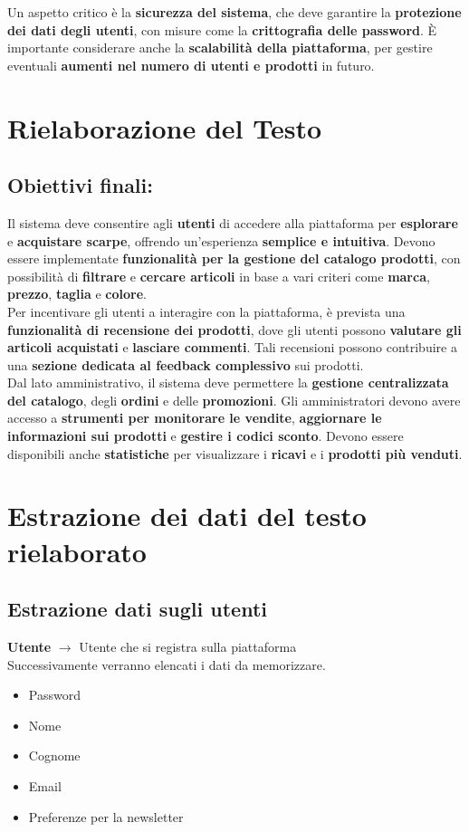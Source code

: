 \documentclass[a4paper,12pt]{report}
\begin{document}
	Un aspetto critico è la \textbf{sicurezza del sistema}, che deve garantire la \textbf{protezione dei dati degli utenti}, con misure come la \textbf{crittografia delle password}. È importante considerare anche la \textbf{scalabilità della piattaforma}, per gestire eventuali \textbf{aumenti nel numero di utenti e prodotti} in futuro.
	
	\section{Rielaborazione del Testo}
	\subsection{Obiettivi finali:}
	Il sistema deve consentire agli \textbf{utenti} di accedere alla piattaforma per \textbf{esplorare} e \textbf{acquistare scarpe}, offrendo un'esperienza \textbf{semplice e intuitiva}. Devono essere implementate \textbf{funzionalità per la gestione del catalogo prodotti}, con possibilità di \textbf{filtrare} e \textbf{cercare articoli} in base a vari criteri come \textbf{marca}, \textbf{prezzo}, \textbf{taglia} e \textbf{colore}. \\
	Per incentivare gli utenti a interagire con la piattaforma, è prevista una \textbf{funzionalità di recensione dei prodotti}, dove gli utenti possono \textbf{valutare gli articoli acquistati} e \textbf{lasciare commenti}. Tali recensioni possono contribuire a una \textbf{sezione dedicata al feedback complessivo} sui prodotti. \\
	Dal lato amministrativo, il sistema deve permettere la \textbf{gestione centralizzata del catalogo}, degli \textbf{ordini} e delle \textbf{promozioni}. Gli amministratori devono avere accesso a \textbf{strumenti per monitorare le vendite}, \textbf{aggiornare le informazioni sui prodotti} e \textbf{gestire i codici sconto}. Devono essere disponibili anche \textbf{statistiche} per visualizzare i \textbf{ricavi} e i \textbf{prodotti più venduti}.
	
	\section{Estrazione dei dati del testo rielaborato}
	\subsection{Estrazione dati sugli utenti}
	\textbf{Utente} $\longrightarrow$ Utente che si registra sulla piattaforma\\
	Successivamente verranno elencati i dati da memorizzare.
	\begin{itemize}
		\item Password
		\item Nome
		\item Cognome
		\item Email
		\item Preferenze per la newsletter
	\end{itemize}
	
\end{document}
